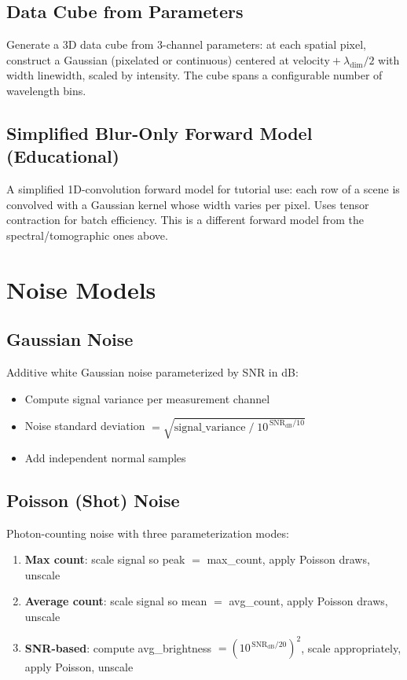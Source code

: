 \documentclass[11pt,a4paper]{article}
\begin{document}
\subsection{Data Cube from Parameters}
Generate a 3D data cube from 3-channel parameters: at each spatial pixel, construct a Gaussian (pixelated or continuous) centered at $\text{velocity} + \lambda_{\text{dim}}/2$ with width $\text{linewidth}$, scaled by intensity. The cube spans a configurable number of wavelength bins.

\subsection{Simplified Blur-Only Forward Model (Educational)}
A simplified 1D-convolution forward model for tutorial use: each row of a scene is convolved with a Gaussian kernel whose width varies per pixel. Uses tensor contraction for batch efficiency. This is a different forward model from the spectral/tomographic ones above.

\section{Noise Models}

\subsection{Gaussian Noise}
Additive white Gaussian noise parameterized by SNR in dB:
\begin{itemize}[nosep]
  \item Compute signal variance per measurement channel
  \item Noise standard deviation $= \sqrt{\text{signal\_variance}\;/\;10^{\,\text{SNR}_{\text{dB}}/10}}$
  \item Add independent normal samples
\end{itemize}

\subsection{Poisson (Shot) Noise}
Photon-counting noise with three parameterization modes:
\begin{enumerate}[nosep]
  \item \textbf{Max count}: scale signal so peak $=$ max\_count, apply Poisson draws, unscale
  \item \textbf{Average count}: scale signal so mean $=$ avg\_count, apply Poisson draws, unscale
  \item \textbf{SNR-based}: compute avg\_brightness $= (10^{\,\text{SNR}_{\text{dB}}/20})^{2}$, scale appropriately, apply Poisson, unscale
\end{enumerate}
\end{document}
